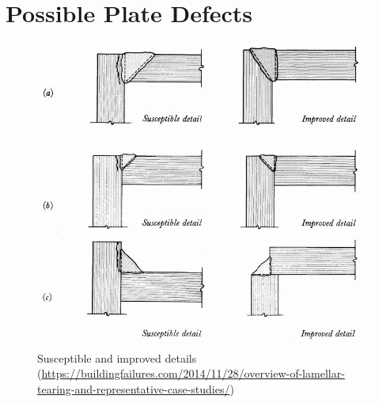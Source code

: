 \section{Possible Plate Defects}
\begin{figure}[H]
\centering
\includegraphics[width=.99\textwidth]{PIC/CH07/LT}
\caption{Susceptible and improved details (\href{https://buildingfailures.com/2014/11/28/overview-of-lamellar-tearing-and-representative-case-studies/}{\url{https://buildingfailures.com/2014/11/28/overview-of-lamellar-tearing-and-representative-case-studies/}})}
\end{figure}
